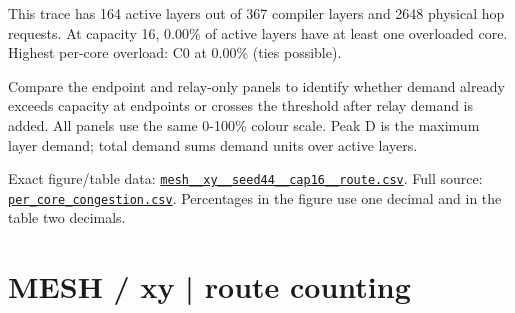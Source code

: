 \documentclass[10pt,a4paper]{article}
\begin{document}
This trace has 164 active layers out of 367 compiler layers and 2648 physical hop requests. At capacity 16, 0.00\% of active layers have at least one overloaded core. Highest per-core overload: C0 at 0.00\% (ties possible).\par
Compare the endpoint and relay-only panels to identify whether demand already exceeds capacity at endpoints or crosses the threshold after relay demand is added. All panels use the same 0-100\% colour scale. Peak D is the maximum layer demand; total demand sums demand units over active layers.\par
Exact figure/table data: \href{\detokenize{file:///home/dhruv-pansuriya/Documents/BTP/Compiler-Driven-ACE/output/pdf/qaoa_methods_congestion/tables/mesh__xy__seed44__cap16__route.csv}}{\nolinkurl{mesh__xy__seed44__cap16__route.csv}}. Full source: \href{\detokenize{file:///home/dhruv-pansuriya/Documents/BTP/Compiler-Driven-ACE/results/qaoa_2seed_2026-10-26/congestion/per_core_congestion.csv}}{\nolinkurl{per_core_congestion.csv}}. Percentages in the figure use one decimal and in the table two decimals.\par
\clearpage
\section*{MESH / xy | route counting}
\end{document}

